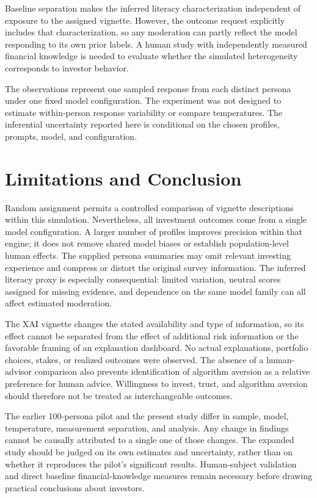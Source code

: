 \documentclass[11pt,a4paper]{article}
\begin{document}
Baseline separation makes the inferred literacy characterization independent of exposure to the assigned vignette. However, the outcome request explicitly includes that characterization, so any moderation can partly reflect the model responding to its own prior labels. A human study with independently measured financial knowledge is needed to evaluate whether the simulated heterogeneity corresponds to investor behavior.

The observations represent one sampled response from each distinct persona under one fixed model configuration. The experiment was not designed to estimate within-person response variability or compare temperatures. The inferential uncertainty reported here is conditional on the chosen profiles, prompts, model, and configuration.


\section{Limitations and Conclusion}
Random assignment permits a controlled comparison of vignette descriptions within this simulation. Nevertheless, all investment outcomes come from a single model configuration. A larger number of profiles improves precision within that engine; it does not remove shared model biases or establish population-level human effects. The supplied persona summaries may omit relevant investing experience and compress or distort the original survey information. The inferred literacy proxy is especially consequential: limited variation, neutral scores assigned for missing evidence, and dependence on the same model family can all affect estimated moderation.

The XAI vignette changes the stated availability and type of information, so its effect cannot be separated from the effect of additional risk information or the favorable framing of an explanation dashboard. No actual explanations, portfolio choices, stakes, or realized outcomes were observed. The absence of a human-advisor comparison also prevents identification of algorithm aversion as a relative preference for human advice. Willingness to invest, trust, and algorithm aversion should therefore not be treated as interchangeable outcomes.

The earlier 100-persona pilot and the present study differ in sample, model, temperature, measurement separation, and analysis. Any change in findings cannot be causally attributed to a single one of those changes. The expanded study should be judged on its own estimates and uncertainty, rather than on whether it reproduces the pilot's significant results. Human-subject validation and direct baseline financial-knowledge measures remain necessary before drawing practical conclusions about investors.
\end{document}

